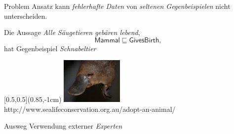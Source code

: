 \documentclass[ngerman]{beamer}
\begin{document}
\begin{frame}
\begin{center}
  \end{center}

\end{frame}

\begin{frame}

  \onslide<+->

  \begin{block}{Problem}
    Ansatz kann \emph{fehlerhafte Daten} von \emph{seltenen Gegenbeispielen} nicht
    unterscheiden.
  \end{block}

  \onslide<+->

  \begin{Beispiel}
    Die Aussage \emph{Alle Säugetieren gebären lebend},
    \begin{equation*}
      \mathsf{Mammal} \sqsubseteq \mathsf{GivesBirth},
    \end{equation*}
    \onslide<+->
    hat Gegenbeispiel \emph{Schnabeltier}
  
    \begin{textblock*}{\linewidth}[0.5,0.5](0.85\linewidth,-1cm)
      \centering
      \includegraphics[width=3cm]{platypus}\\[-2ex]
      {\fontsize{3pt}{4pt}\selectfont http://www.sealifeconservation.org.au/adopt-an-animal/}
    \end{textblock*}

  \end{Beispiel}

  \onslide<+->

  \begin{block}{Ausweg}
    Verwendung externer \emph{Experten}
  \end{block}

\end{frame}
\end{document}
